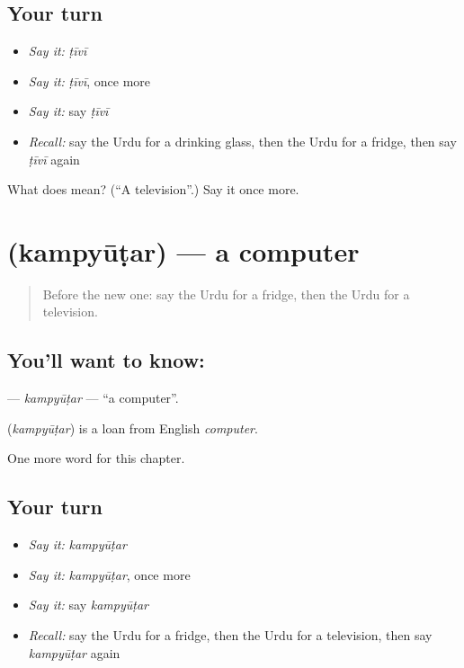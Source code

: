 \subsection*{Your turn}
\begin{itemize}
\raggedright
  \item \emph{Say it:} \emph{ṭīvī}
  \item \emph{Say it:} \emph{ṭīvī}, once more
  \item \emph{Say it:} say \emph{ṭīvī}
  \item \emph{Recall:} say the Urdu for a drinking glass, then the Urdu for a fridge, then say \emph{ṭīvī} again
\end{itemize}

\begin{tcolorbox}[breakable,colback=teal!4,colframe=teal!35!black,title={Before you move on}]
What does   mean? (\textquotedblleft{}A television\textquotedblright{}.) Say it once more.
\end{tcolorbox}
\section[\texorpdfstring{\ur{کمپیوٹر} (kampyūṭar)}{کمپیوٹر (kampyūṭar)}]{ (kampyūṭar) — a computer}

\label{lesson:UR-C110-kampyutar}



\begin{quote}
Before the new one: say the Urdu for a fridge, then the Urdu for a television.
\end{quote}

\subsection*{You'll want to know: }
\textbf{} — \emph{kampyūṭar} — \textquotedblleft{}a computer\textquotedblright{}.

\begin{cousinweb}
\textbf{} (\emph{kampyūṭar}) is a loan from English \emph{computer}.
\end{cousinweb}

\begin{grammarlens}[title={What you've built}]
One more word for this chapter.
\end{grammarlens}

\subsection*{Your turn}
\begin{itemize}
\raggedright
  \item \emph{Say it:} \emph{kampyūṭar}
  \item \emph{Say it:} \emph{kampyūṭar}, once more
  \item \emph{Say it:} say \emph{kampyūṭar}
  \item \emph{Recall:} say the Urdu for a fridge, then the Urdu for a television, then say \emph{kampyūṭar} again
\end{itemize}

